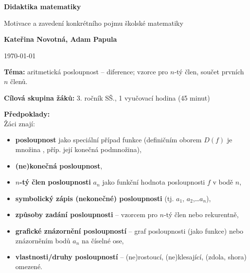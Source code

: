 \documentclass[12pt,a4paper,addpoints]{article}
\def\maintitle{Didaktika matematiky}
\def\subtitle{Motivace a zavedení konkrétního pojmu školské matematiky}
\def\authorname{Kateřina Novotná, Adam Papula}
\begin{document}
    \begin{titlepage}
        \begin{center}
            \Large\textbf{{\maintitle}}

            \normalsize
            \vspace{0.5cm}
                \subtitle
            \vspace{1.5cm}
            
            \textbf{\authorname}
            \vspace{1.5cm}

            \today
            \vfill
            
            \raggedright
                \textbf{Téma:} aritmetická posloupnost -- diference; vzorce pro $n$-tý člen, součet prvních $n$ členů.
                
                \textbf{Cílová skupina žáků:} 3. ročník SŠ., 1 vyučovací hodina (45 minut)
                
                \textbf{Předpoklady:}\\
                    \footnotesize
                    Žáci znají:
                    \vspace{-5mm}
                        \begin{itemize}[noitemsep,topsep=0pt]
                                \item \textbf{posloupnost} jako speciální případ funkce (definičním oborem $D(f)$ je množina , příp. její konečná podmnožina), 
                                \item \textbf{(ne)konečná posloupnost},
                                \item \textbf{$n$-tý člen posloupnosti} $a_n$ jako funkční hodnota posloupnosti $f$ v bodě $n$,
                                \item \textbf{symbolický zápis (nekonečné) posloupnosti} (tj. $a_1$, $a_2$,\dots $a_n$),
                                \item \textbf{způsoby zadání posloupnosti} -- vzorcem pro $n$-tý člen nebo rekurentně,
                                \item \textbf{grafické znázornění posloupností} -- graf posloupnosti (jako funkce) nebo znázorněním bodů $a_n$ na číselné ose,
                                \item \textbf{vlastnosti/druhy posloupností} -- (ne)rostoucí, (ne)klesající, (zdola, shora) omezené.
                        \end{itemize}
                \normalsize
        \end{center}
    \end{titlepage}
\end{document}
